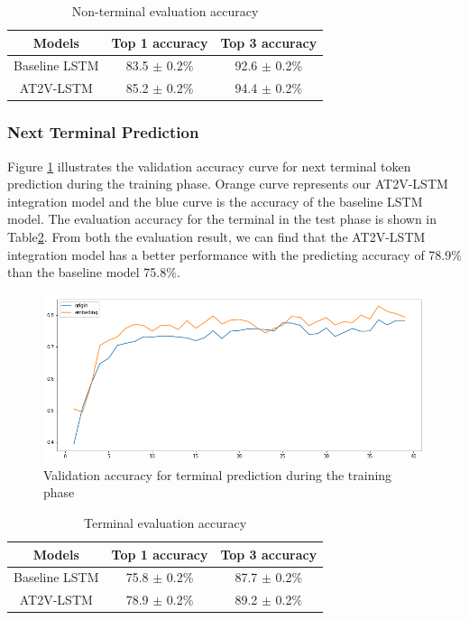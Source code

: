 \documentclass[E]{compsoft}
\begin{document}
\begin{table}
\centering
\begin{tabular}{ccc}
\hline
Models& Top 1 accuracy& Top 3 accuracy\\
\hline
Baseline LSTM& 83.5 $\pm$ 0.2\% & 92.6 $\pm$ 0.2\% \\
AT2V-LSTM& 85.2 $\pm$ 0.2\% & 94.4 $\pm$ 0.2\% \\
\hline
\end{tabular}
\caption{Non-terminal evaluation accuracy}
\label{table:non-terminal-evalution-accuracy}
\end{table}



\subsubsection{Next Terminal Prediction} 
Figure \ref{fig:valid_accuracy_for_terminal} illustrates the validation accuracy curve for next terminal token prediction during the training phase. 
Orange curve represents our AT2V-LSTM integration model and the blue curve is the accuracy of the baseline LSTM model. 
The evaluation accuracy for the terminal in the test phase is shown in Table\ref{table:terminal-evalution-accuracy}. 
From both the evaluation result, we can find that the AT2V-LSTM integration model has a better performance with the predicting accuracy of 78.9\% than the baseline model 75.8\%. 


\begin{figure}[!ht]
\centering
\includegraphics[scale=0.25]{pictures/tt_valid_accuracy.png}
\caption{Validation accuracy for terminal prediction during the training phase}
\label{fig:valid_accuracy_for_terminal}
\end{figure}


\begin{table}
\centering
\begin{tabular}{ccc}
\hline
Models& Top 1 accuracy& Top 3 accuracy\\
\hline
Baseline LSTM& 75.8 $\pm$ 0.2\% & 87.7 $\pm$ 0.2\% \\
AT2V-LSTM& 78.9 $\pm$ 0.2\% & 89.2 $\pm$ 0.2\% \\
\hline
\end{tabular}
\caption{Terminal evaluation accuracy}
\label{table:terminal-evalution-accuracy}
\end{table}
\end{document}
